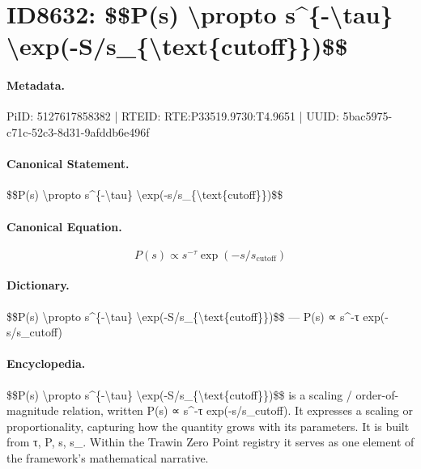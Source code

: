 \section*{ID8632: \$\$P(s) \textbackslash{}propto s\textasciicircum{}\{-\textbackslash{}tau\} \textbackslash{}exp(-S/s\_\{\textbackslash{}text\{cutoff\}\})\$\$}
\paragraph{Metadata.}
PiID: 5127617858382 | RTEID: RTE:P33519.9730:T4.9651 | UUID: 5bac5975-c71c-52c3-8d31-9afddb6e496f

\paragraph{Canonical Statement.}
\$\$P(s) \textbackslash{}propto s\textasciicircum{}\{-\textbackslash{}tau\} \textbackslash{}exp(-s/s\_\{\textbackslash{}text\{cutoff\}\})\$\$

\paragraph{Canonical Equation.}
\[
P(s) \propto s^{-\tau} \exp(-s/s_{\text{cutoff}})
\]

\paragraph{Dictionary.}
\$\$P(s) \textbackslash{}propto s\textasciicircum{}\{-\textbackslash{}tau\} \textbackslash{}exp(-S/s\_\{\textbackslash{}text\{cutoff\}\})\$\$ — P(s) ∝ s\textasciicircum{}-τ exp(-s/s\_cutoff)

\paragraph{Encyclopedia.}
\$\$P(s) \textbackslash{}propto s\textasciicircum{}\{-\textbackslash{}tau\} \textbackslash{}exp(-S/s\_\{\textbackslash{}text\{cutoff\}\})\$\$ is a scaling / order-of-magnitude relation, written P(s) ∝ s\textasciicircum{}-τ exp(-s/s\_cutoff). It expresses a scaling or proportionality, capturing how the quantity grows with its parameters. It is built from τ, P, s, s\_. Within the Trawin Zero Point registry it serves as one element of the framework's mathematical narrative.
